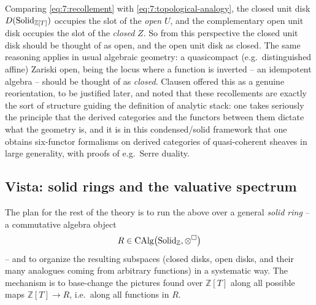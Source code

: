 \begin{remark}
\label{rmk:7:verdict}
Comparing \eqref{eq:7:recollement} with \eqref{eq:7:topological-analogy}, the
closed unit disk $D(\mathrm{Solid}_{\mathbb{Z}[T]})$ occupies the slot of the
\emph{open} $U$, and the complementary open unit disk occupies the slot of the
\emph{closed} $Z$. So from this perspective the closed unit disk should be
thought of as open, and the open unit disk as closed. The same reasoning
applies in usual algebraic geometry: a quasicompact (e.g.\ distinguished
affine) Zariski open, being the locus where a function is inverted -- an
idempotent algebra -- should be thought of as \emph{closed}. Clausen offered
this as a genuine reorientation, to be justified later, and noted that these
recollements are exactly the sort of structure guiding the definition of
analytic stack: one takes seriously the principle that the derived categories
and the functors between them dictate what the geometry is, and it is in this
condensed/solid framework that one obtains six-functor formalisms on derived
categories of quasi-coherent sheaves in large generality, with proofs of e.g.\
Serre duality.
\end{remark}

\subsection{Vista: solid rings and the valuative spectrum}

The plan for the rest of the theory is to run the above over a general
\emph{solid ring} -- a commutative algebra object
\begin{equation*}
R\in\operatorname{CAlg}\bigl(\mathrm{Solid}_{\mathbb{Z}},\otimes^{\square}\bigr)
\end{equation*}
-- and to organize the resulting subspaces (closed disks, open disks, and
their many analogues coming from arbitrary functions) in a systematic way. The
mechanism is to base-change the pictures found over $\mathbb{Z}[T]$ along all
possible maps $\mathbb{Z}[T]\to R$, i.e.\ along all functions in $R$.


